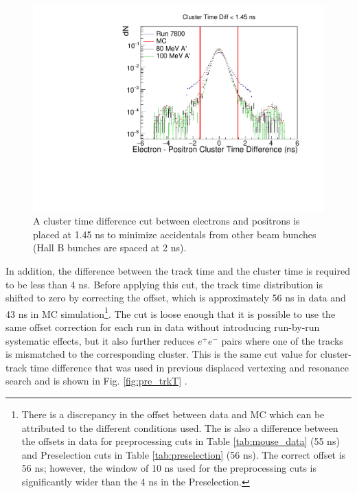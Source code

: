 \begin{figure}[t]
    \centering
    \includegraphics[width=.45\textwidth]{figs/recon/pre_clT.pdf}
    \caption{A cluster time difference cut between electrons and positrons is placed at 1.45 ns to minimize accidentals from other beam bunches (Hall B bunches are spaced at 2 ns). %
    }
    \label{fig:pre_clT_uncChisq}
\end{figure}

In addition, the difference between the track time and the cluster time is required to be less than 4 ns. Before applying this cut, the track time distribution is shifted to zero by correcting the offset, which is approximately 56 ns in data and 43 ns in MC simulation\footnote{There is a discrepancy in the offset between data and MC which can be attributed to the different conditions used. The is also a difference between the offsets in data for preprocessing cuts in Table \ref{tab:mouse_data} (55 ns) and Preselection cuts in Table \ref{tab:preselection} (56 ns). The correct offset is 56 ns; however, the window of 10 ns used for the preprocessing cuts is significantly wider than the 4 ns in the Preselection.}. The cut is loose enough that it is possible to use the same offset correction for each run in data without introducing run-by-run systematic effects, but it also further reduces $e^{+}e^{-}$ pairs where one of the tracks is mismatched to the corresponding cluster. This is the same cut value for cluster-track time difference that was used in previous displaced vertexing and resonance search and is shown in Fig. \ref{fig:pre_trkT} \cite{adrian2018search} \cite{article}.


